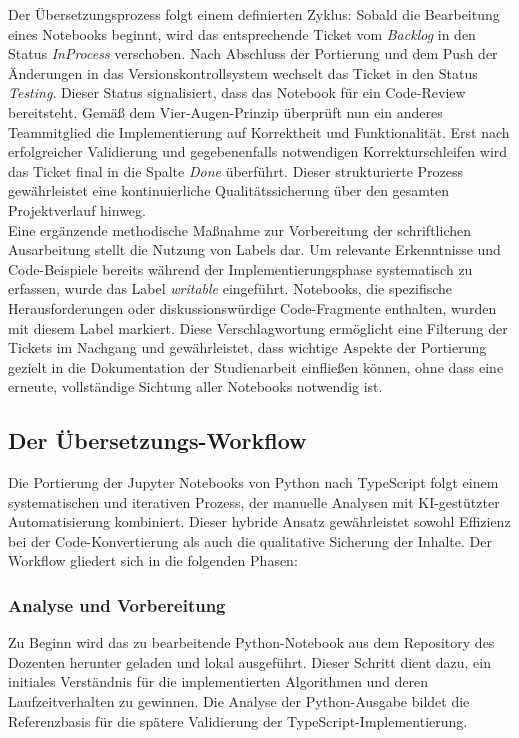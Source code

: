 Der Übersetzungsprozess folgt einem definierten Zyklus: Sobald die Bearbeitung eines Notebooks beginnt, wird das entsprechende Ticket vom \textit{Backlog} in den Status \textit{InProcess} verschoben. Nach Abschluss der Portierung und dem Push der Änderungen in das Versionskontrollsystem wechselt das Ticket in den Status \textit{Testing}. Dieser Status signalisiert, dass das Notebook für ein Code-Review bereitsteht. Gemäß dem Vier-Augen-Prinzip überprüft nun ein anderes Teammitglied die Implementierung auf Korrektheit und Funktionalität. Erst nach erfolgreicher Validierung und gegebenenfalls notwendigen Korrekturschleifen wird das Ticket final in die Spalte \textit{Done} überführt. Dieser strukturierte Prozess gewährleistet eine kontinuierliche Qualitätssicherung über den gesamten Projektverlauf hinweg.\\
Eine ergänzende methodische Maßnahme zur Vorbereitung der schriftlichen Ausarbeitung stellt die Nutzung von Labels dar. Um relevante Erkenntnisse und Code-Beispiele bereits während der Implementierungsphase systematisch zu erfassen, wurde das Label \textit{writable} eingeführt. Notebooks, die spezifische Herausforderungen oder diskussionswürdige Code-Fragmente enthalten, wurden mit diesem Label markiert. Diese Verschlagwortung ermöglicht eine Filterung der Tickets im Nachgang und gewährleistet, dass wichtige Aspekte der Portierung gezielt in die Dokumentation der Studienarbeit einfließen können, ohne dass eine erneute, vollständige Sichtung aller Notebooks  notwendig ist.


\subsection{Der Übersetzungs-Workflow}
Die Portierung der Jupyter Notebooks von Python nach TypeScript folgt einem systematischen und iterativen Prozess, der manuelle Analysen mit \ac{KI}-gestützter Automatisierung kombiniert. Dieser hybride Ansatz gewährleistet sowohl Effizienz bei der Code-Konvertierung als auch die qualitative Sicherung der Inhalte. Der Workflow gliedert sich in die folgenden Phasen:

\subsubsection{Analyse und Vorbereitung}
Zu Beginn wird das zu bearbeitende Python-Notebook aus dem Repository des Dozenten herunter geladen und lokal ausgeführt. Dieser Schritt dient dazu, ein initiales Verständnis für die implementierten Algorithmen und deren Laufzeitverhalten zu gewinnen. Die Analyse der Python-Ausgabe bildet die Referenzbasis für die spätere Validierung der TypeScript-Implementierung.

